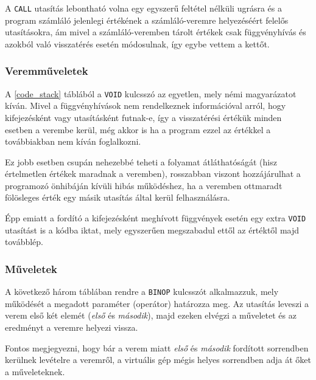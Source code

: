 A \texttt{CALL} utasítás lebontható volna egy egyszerű feltétel nélküli ugrásra és a program számláló jelenlegi értékének a számláló-veremre helyezéséért felelős utasításokra, ám mivel a számláló-veremben tárolt értékek csak függvényhívás és azokból való visszatérés esetén módosulnak, így egybe vettem a kettőt.

\subsubsection{Veremműveletek}


A \ref{code_stack} táblából a \texttt{VOID} kulcsszó az egyetlen, mely némi magyarázatot kíván. Mivel a függvényhívások nem rendelkeznek információval arról, hogy kifejezésként vagy utasításként futnak-e, így a visszatérési értékük minden esetben a verembe kerül, még akkor is ha a program ezzel az értékkel a továbbiakban nem kíván foglalkozni.

Ez jobb esetben csupán nehezebbé teheti a folyamat átláthatóságát (hisz értelmetlen értékek maradnak a veremben), rosszabban viszont hozzájárulhat a programozó önhibáján kívüli hibás működéshez, ha a veremben ottmaradt fölösleges érték egy másik utasítás által kerül felhasználásra.

Épp emiatt a fordító a kifejezésként meghívott függvények esetén egy extra \texttt{VOID} utasítást is a kódba iktat, mely egyszerűen megszabadul ettől az értéktől majd továbblép.

\subsubsection{Műveletek}

A következő három táblában rendre a \texttt{BINOP} kulcsszót alkalmazzuk, mely működését a megadott paraméter (operátor) határozza meg. Az utasítás leveszi a verem első két elemét (\textit{első} és \textit{második}), majd ezeken elvégzi a műveletet és az eredményt a veremre helyezi vissza.

Fontos megjegyezni, hogy bár a verem miatt \textit{első} és \textit{második} fordított sorrendben kerülnek levételre a veremről, a virtuális gép mégis helyes sorrendben adja át őket a műveleteknek.


